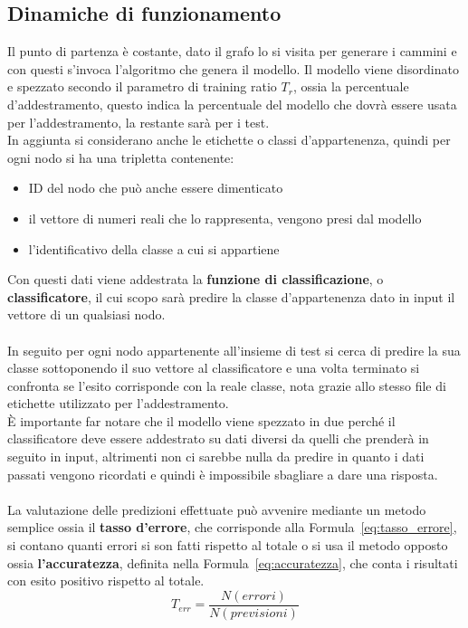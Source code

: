 \subsection{Dinamiche di funzionamento}
Il punto di partenza è costante, dato il grafo lo si visita per generare i cammini e con questi s'invoca l'algoritmo che genera il modello. Il modello viene disordinato e spezzato secondo il parametro di training ratio $T_r$, ossia la percentuale d'addestramento, questo indica la percentuale del modello che dovrà essere usata per l'addestramento, la restante sarà per i test.\\
In aggiunta si considerano anche le etichette o classi d'appartenenza, quindi per ogni nodo si ha una tripletta contenente:
\begin{itemize}
	\item ID del nodo che può anche essere dimenticato
	\item il vettore di numeri reali che lo rappresenta, vengono presi dal modello
	\item l'identificativo della classe a cui si appartiene
\end{itemize}
Con questi dati viene addestrata la \textbf{funzione di classificazione}, o \textbf{classificatore}, il cui scopo sarà predire la classe d'appartenenza dato in input il vettore di un qualsiasi nodo.\\
\\
In seguito per ogni nodo appartenente all'insieme di test si cerca di predire la sua classe sottoponendo il suo vettore al classificatore e una volta terminato si confronta se l'esito corrisponde con la reale classe, nota grazie allo stesso file di etichette utilizzato per l'addestramento.\\
È importante far notare che il modello viene spezzato in due perché il classificatore deve essere addestrato su dati diversi da quelli che prenderà in seguito in input, altrimenti non ci sarebbe nulla da predire in quanto i dati passati vengono ricordati e quindi è impossibile sbagliare a dare una risposta.\\
\\
La valutazione delle predizioni effettuate può avvenire mediante un metodo semplice ossia il \textbf{tasso d'errore}, che corrisponde alla Formula~\ref{eq:tasso_errore}, si contano quanti errori si son fatti rispetto al totale o si usa il metodo opposto ossia \textbf{l'accuratezza}, definita nella Formula~\ref{eq:accuratezza}, che conta i risultati con esito positivo rispetto al totale.
%
\begin{equation}
	T_{err} = \frac{N(errori)}{N(previsioni)}
	\label{eq:tasso_errore}
\end{equation}
